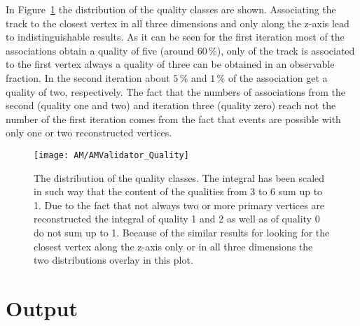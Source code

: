 In Figure~\ref{plot:AMWFQualityDist} the distribution of the quality classes are shown. Associating the track to the closest vertex in all three dimensions and only along the z-axis lead to indistinguishable results. As it can be seen for the first iteration most of the associations obtain a quality of five (around $60\,\%$), only of the track is associated to the first vertex always a quality of three can be obtained in an observable fraction. In the second iteration about $5\,\%$ and $1\,\%$ of the association get a quality of two, respectively. The fact that the numbers of associations from the second (quality one and two) and iteration three (quality zero) reach not the number of the first iteration comes from the fact that events are possible with only one or two reconstructed vertices.  

\begin{figure}[!ht]
  \centering
  \texttt{[image: AM/AMValidator\_Quality]}
  \caption[Distribution of the quality classes]{The distribution of the quality classes. The integral has been scaled in such way that the content of the qualities from 3 to 6 sum up to 1. Due to the fact that not always two or more primary vertices are reconstructed the integral of quality 1 and 2 as well as of quality 0 do not sum up to 1. Because of the similar results for looking for the closest vertex along the z-axis only or in all three dimensions the two distributions overlay in this plot. \label{plot:AMWFQualityDist}}
\end{figure}

\section{Output\label{sec:AMOutput}}

